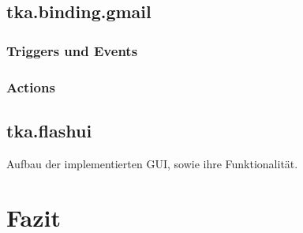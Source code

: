 \subsection{tka.binding.gmail}
\subsubsection{Triggers und Events}
\subsubsection{Actions}

\subsection{tka.flashui}
Aufbau der implementierten GUI, sowie ihre Funktionalität.

\section{Fazit}